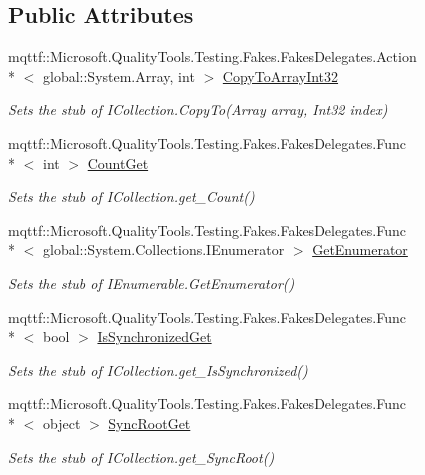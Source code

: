 \subsection*{Public Attributes}
\begin{DoxyCompactItemize}
\item 
mqttf\-::\-Microsoft.\-Quality\-Tools.\-Testing.\-Fakes.\-Fakes\-Delegates.\-Action\\*
$<$ global\-::\-System.\-Array, int $>$ \hyperlink{class_system_1_1_collections_1_1_fakes_1_1_stub_i_collection_a24d4ee2cb14924eafb5a44577d8c02ce}{Copy\-To\-Array\-Int32}
\begin{DoxyCompactList}\small\item\em Sets the stub of I\-Collection.\-Copy\-To(\-Array array, Int32 index)\end{DoxyCompactList}\item 
mqttf\-::\-Microsoft.\-Quality\-Tools.\-Testing.\-Fakes.\-Fakes\-Delegates.\-Func\\*
$<$ int $>$ \hyperlink{class_system_1_1_collections_1_1_fakes_1_1_stub_i_collection_a3c486fdda91baa220ed9321b5b88a7b8}{Count\-Get}
\begin{DoxyCompactList}\small\item\em Sets the stub of I\-Collection.\-get\-\_\-\-Count()\end{DoxyCompactList}\item 
mqttf\-::\-Microsoft.\-Quality\-Tools.\-Testing.\-Fakes.\-Fakes\-Delegates.\-Func\\*
$<$ global\-::\-System.\-Collections.\-I\-Enumerator $>$ \hyperlink{class_system_1_1_collections_1_1_fakes_1_1_stub_i_collection_afccd99531ebf222cc167550a2b6e0cbf}{Get\-Enumerator}
\begin{DoxyCompactList}\small\item\em Sets the stub of I\-Enumerable.\-Get\-Enumerator()\end{DoxyCompactList}\item 
mqttf\-::\-Microsoft.\-Quality\-Tools.\-Testing.\-Fakes.\-Fakes\-Delegates.\-Func\\*
$<$ bool $>$ \hyperlink{class_system_1_1_collections_1_1_fakes_1_1_stub_i_collection_a7f56b563958d26edda45adf6c905a889}{Is\-Synchronized\-Get}
\begin{DoxyCompactList}\small\item\em Sets the stub of I\-Collection.\-get\-\_\-\-Is\-Synchronized()\end{DoxyCompactList}\item 
mqttf\-::\-Microsoft.\-Quality\-Tools.\-Testing.\-Fakes.\-Fakes\-Delegates.\-Func\\*
$<$ object $>$ \hyperlink{class_system_1_1_collections_1_1_fakes_1_1_stub_i_collection_a9bd2907951b034c5fbb0d23188b442ed}{Sync\-Root\-Get}
\begin{DoxyCompactList}\small\item\em Sets the stub of I\-Collection.\-get\-\_\-\-Sync\-Root()\end{DoxyCompactList}\end{DoxyCompactItemize}


